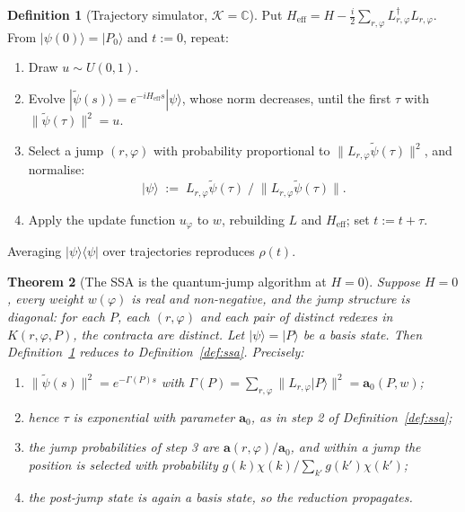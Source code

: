 \documentclass[11pt,a4paper]{article}
\theoremstyle{plain}
\newtheorem{theorem}{Theorem}
\theoremstyle{definition}
\newtheorem{definition}[theorem]{Definition}
\theoremstyle{remark}
\newcommand{\Cx}{\mathbb{C}}
\newcommand{\prop}{\mathbf{a}}
\newcommand{\wmap}{w}
\newcommand{\gfac}{g}
\newcommand{\Lop}{L}
\newcommand{\Heff}{H_{\mathrm{eff}}}
\begin{document}
\begin{definition}[Trajectory simulator, $\mathcal{K} = \Cx$]
\label{def:qjump}
Put $\Heff = H - \tfrac{i}{2}\sum_{r,\varphi}\Lop^\dagger_{r,\varphi}\Lop_{r,\varphi}$. From
$|\psi(0)\rangle = |P_0\rangle$ and $t := 0$, repeat:
\begin{enumerate}[leftmargin=2.2em]
\item Draw $u \sim U(0,1)$.
\item Evolve $|\tilde\psi(s)\rangle = e^{-i \Heff s}|\psi\rangle$, whose norm decreases, until the
first $\tau$ with $\|\tilde\psi(\tau)\|^2 = u$.
\item Select a jump $(r,\varphi)$ with probability proportional to
$\|\Lop_{r,\varphi}\tilde\psi(\tau)\|^2$, and normalise:
\[
|\psi\rangle \;:=\; \Lop_{r,\varphi}\tilde\psi(\tau) \;\big/\; \big\|\Lop_{r,\varphi}\tilde\psi(\tau)\big\| .
\]
\item Apply the update function $u_\varphi$ to $\wmap$, rebuilding $\Lop$ and $\Heff$; set
$t := t + \tau$.
\end{enumerate}
Averaging $|\psi\rangle\langle\psi|$ over trajectories reproduces $\rho(t)$.
\end{definition}

\begin{theorem}[The SSA is the quantum-jump algorithm at $H=0$]
\label{thm:jump-gillespie}
Suppose $H = 0$, every weight $\wmap(\varphi)$ is real and non-negative, and the jump structure is
\emph{diagonal}: for each $P$, each $(r,\varphi)$ and each pair of distinct redexes in
$K(r,\varphi,P)$, the contracta are distinct. Let $|\psi\rangle = |P\rangle$ be a basis state. Then
Definition~\ref{def:qjump} reduces to Definition~\ref{def:ssa}. Precisely:
\begin{enumerate}[label=(\roman*),leftmargin=2.2em]
\item $\|\tilde\psi(s)\|^2 = e^{-\Gamma(P)s}$ with
$\Gamma(P) = \sum_{r,\varphi}\|\Lop_{r,\varphi}|P\rangle\|^2 = \prop_0(P,\wmap)$;
\item hence $\tau$ is exponential with parameter $\prop_0$, as in step 2 of
Definition~\ref{def:ssa};
\item the jump probabilities of step 3 are $\prop(r,\varphi)/\prop_0$, and within a jump the
position is selected with probability $\gfac(k)\chi(k)/\sum_{k'}\gfac(k')\chi(k')$;
\item the post-jump state is again a basis state, so the reduction propagates.
\end{enumerate}
\end{theorem}
\end{document}

